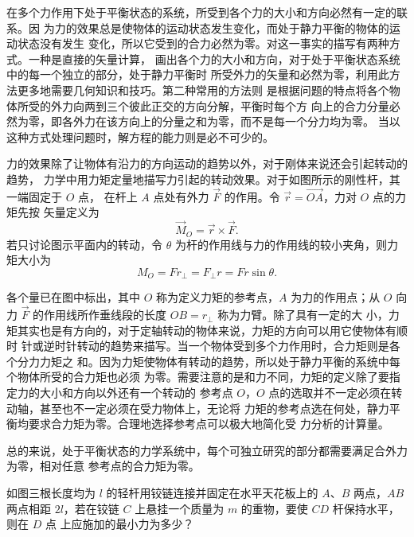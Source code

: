 {在多个力作用下处于平衡状态的系统，所受到各个力的大小和方向必然有一定的联系。因
为力的效果总是使物体的运动状态发生变化，而处于静力平衡的物体的运动状态没有发生
变化，所以它受到的合力必然为零。对这一事实的描写有两种方式。一种是直接的矢量计算，
画出各个力的大小和方向，对于处于平衡状态系统中的每一个独立的部分，处于静力平衡时
所受外力的矢量和必然为零，利用此方法更多地需要几何知识和技巧。第二种常用的方法则
是根据问题的特点将各个物体所受的外力向两到三个彼此正交的方向分解，平衡时每个方
向上的合力分量必然为零，即各外力在该方向上的分量之和为零，而不是每一个分力均为零。
当以这种方式处理问题时，解方程的能力则是必不可少的。

\label{ch05:fig:s03-1-1}

力的效果除了让物体有沿力的方向运动的趋势以外，对于刚体来说还会引起转动的趋势，
力学中用力矩定量地描写力引起的转动效果。对于如图所示的刚性杆，其一端固定于 $O$ 点，
在杆上 $A$ 点处有外力 $\vec F$ 的作用。令 $\vec r=\overrightarrow{OA}$，力对 $O$ 点的力矩先按
矢量定义为
\begin{equation}
  \vec M_O=\vec r\times\vec F.
\end{equation}
若只讨论图示平面内的转动，令 $\theta$ 为杆的作用线与力的作用线的较小夹角，则力矩大小为
\begin{equation}
  M_O=Fr_{\perp}=F_{\perp}r=Fr\sin\theta.
\end{equation}

各个量已在图中标出，其中 $O$ 称为定义力矩的参考点，$A$ 为力的作用点；从 $O$ 向力
$\vec F$ 的作用线所作垂线段的长度 $OB=r_\perp$ 称为力臂。除了具有一定的大
小，力矩其实也是有方向的，对于定轴转动的物体来说，力矩的方向可以用它使物体有顺时
针或逆时针转动的趋势来描写。当一个物体受到多个力作用时，合力矩则是各个分力力矩之
和。因为力矩使物体有转动的趋势，所以处于静力平衡的系统中每个物体所受的合力矩也必须
为零。需要注意的是和力不同，力矩的定义除了要指定力的大小和方向以外还有一个转动的
参考点 $O$，$O$ 点的选取并不一定必须在转动轴，甚至也不一定必须在受力物体上，无论将
力矩的参考点选在何处，静力平衡均要求合力矩为零。合理地选择参考点可以极大地简化受
力分析的计算量。

总的来说，处于平衡状态的力学系统中，每个可独立研究的部分都需要满足合外力为零，相对任意
参考点的合力矩为零。

\begin{origexamplebox}{}\label{ch05:ex:s03-1-10}
如图三根长度均为 $l$ 的轻杆用铰链连接并固定在水平天花板上的 $A$、$B$ 两点，$AB$
两点相距 $2l$，若在铰链 $C$ 上悬挂一个质量为 $m$ 的重物，要使 $CD$ 杆保持水平，则在 $D$ 点
上应施加的最小力为多少？
\sourcefigurefixB
\end{origexamplebox}

}
